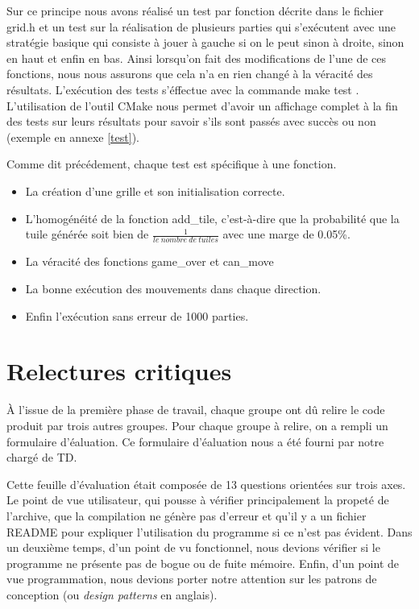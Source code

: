 \documentclass[12pt]{article}
\begin{document}
\par Sur ce principe nous avons r\'ealis\'e un test par fonction d\'ecrite dans
le fichier \og grid.h \fg{} et un test sur la r\'ealisation de plusieurs parties
qui s'ex\'ecutent avec une strat\'egie basique qui consiste \`a jouer à gauche
si on le peut sinon \`a droite, sinon en haut et enfin en bas. Ainsi lorsqu'on fait
des modifications de l'une de ces fonctions, nous nous assurons que cela n'a en
rien chang\'e \`a la v\'eracit\'e des r\'esultats. L'ex\'ecution des tests
s'\'effectue avec la commande \og make test \fg{}. L'utilisation de l'outil \og CMake \fg{} nous permet d'avoir un affichage complet \`a la fin des tests sur leurs r\'esultats pour savoir s'ils sont pass\'es avec succ\`es
ou non (exemple en annexe \ref{test}).

\par Comme dit pr\'ec\'edement, chaque test est sp\'ecifique \`a une fonction.
\begin{itemize}
  \item La cr\'eation d'une grille et son initialisation correcte.
  \item L'homog\'en\'eit\'e de la fonction add\_tile, c'est-\`a-dire que la
  probabilit\'e que la tuile g\'en\'er\'ee soit bien de $
  \frac{1}{le\ nombre\ de\ tuiles} $ avec une marge de 0.05\%.
  \item La v\'eracit\'e des fonctions \og game\_over \fg{} et \og can\_move
  \fg{}
  \item La bonne ex\'ecution des mouvements dans chaque direction.
  \item Enfin l'ex\'ecution sans erreur de 1000 parties.
\end{itemize}

\newpage
\section{Relectures critiques}
\`A l’issue de la premi\`ere phase de travail, chaque groupe ont d\^u relire le
code produit par trois autres groupes. Pour chaque groupe \`a relire, on a
rempli un formulaire d’\'ealuation. Ce formulaire d’\'ealuation nous a \'et\'e
fourni par notre charg\'e de TD.

\par Cette feuille d'\'evaluation \'etait compos\'ee de 13 questions orient\'ees
sur trois axes. Le point de vue utilisateur, qui pousse \`a v\'erifier
principalement la propet\'e de l'archive, que la compilation ne g\'en\`ere pas
d'erreur et qu'il y a un fichier \og README \fg{} pour expliquer l'utilisation
du programme si ce n'est pas \'evident. Dans un deuxi\`eme temps, d'un point de
vu fonctionnel, nous devions v\'erifier si le programme ne pr\'esente pas de
bogue ou de fuite m\'emoire. Enfin, d'un point de vue programmation, nous
devions porter notre attention sur les patrons de conception (ou \textit{design
patterns} en anglais).
\end{document}
